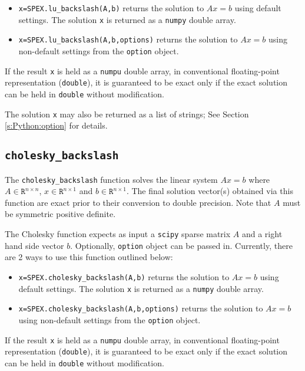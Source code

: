 \documentclass[12pt]{report}
\theoremstyle{definition}
\begin{document}
\begin{itemize}
    \item \verb|x=SPEX.lu_backslash(A,b)| returns the solution to $A x = b$ using default settings. The solution \verb|x| is returned as a \verb|numpy| double array.
    \item \verb|x=SPEX.lu_backslash(A,b,options)| returns the solution to $A x = b$ using non-default settings from the \verb|option| object.
\end{itemize}

If the result \verb|x| is held as a \verb|numpu| double array, in conventional floating-point representation (\verb|double|), it is guaranteed to be exact only if the exact solution can be held in \verb|double| without modification.

The solution \verb|x| may also be returned as a list of strings; See Section \ref{s:Python:option} for details.

\subsection{\texttt{cholesky\_backslash}}

The \verb|cholesky_backslash| function solves the linear system $Ax=b$ where$A \in \mathtt{R}^{n \times n}$, $x \in \mathtt{R}^{n \times 1}$ and $b \in \mathtt{R}^{n \times 1}$. The final solution vector(s) obtained via this function are exact prior to their conversion to double precision. Note that $A$ must be symmetric positive definite.

The Cholesky function expects as input a \verb|scipy| sparse matrix $A$ and a right hand side vector $b$. Optionally, \verb|option| object can be passed in.
Currently, there are 2 ways to use this function outlined below:

\begin{itemize}
    \item \verb|x=SPEX.cholesky_backslash(A,b)| returns the solution to $A x = b$ using default settings. The solution \verb|x| is returned as a \verb|numpy| double array.
    \item \verb|x=SPEX.cholesky_backslash(A,b,options)| returns the solution to $A x = b$ using non-default settings from the \verb|option| object.
\end{itemize}

If the result \verb|x| is held as a \verb|numpu| double array, in conventional floating-point representation (\verb|double|), it is guaranteed to be exact only if the exact solution can be held in \verb|double| without modification.
\end{document}
